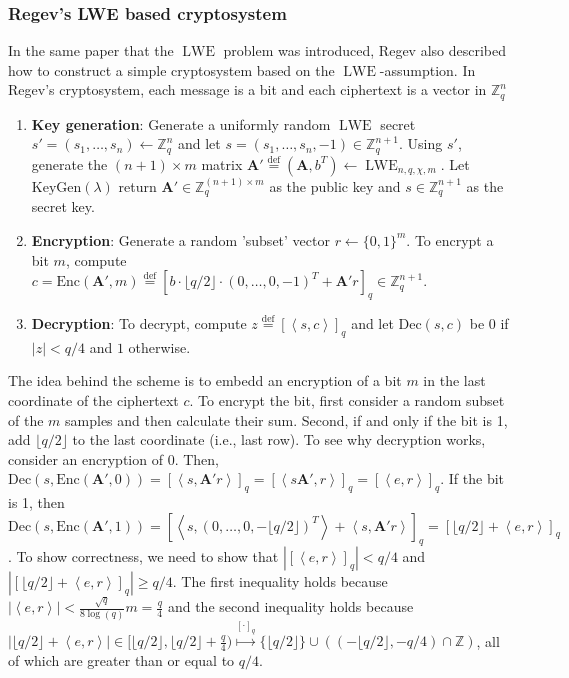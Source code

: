 \subsubsection*{Regev's LWE based cryptosystem}
In the same paper that the $\operatorname{LWE}$ problem was introduced, Regev also described how to construct a simple cryptosystem based on the $\operatorname{LWE}$-assumption. In Regev's cryptosystem, each message is a bit and each ciphertext is a vector in $\mathbb{Z}_q^n$
\begin{enumerate}
    \item \textbf{Key generation}: Generate a uniformly random $\operatorname{LWE}$ secret $s' = (s_1, \dots, s_n) \leftarrow \mathbb{Z}_q^n$ and let $s = (s_1, \dots, s_n, -1) \in \mathbb{Z}_q^{n+1}$. Using $s'$, generate the $(n+1) \times m$ matrix $\textbf{A}' \stackrel{\mathrm{def}}{=} (\textbf{A}, b^T) \leftarrow \operatorname{LWE}_{n,q,\chi,m}$. Let $\text{KeyGen}(\lambda)$ return $\textbf{A}' \in \mathbb{Z}_q^{(n+1)\times m}$ as the public key and $s \in \mathbb{Z}_q^{n+1}$ as the secret key.
    \item \textbf{Encryption}: Generate a random 'subset' vector $r \leftarrow \{0,1\}^m$. To encrypt a bit $m$, compute $c = \text{Enc}(\textbf{A}',m) \stackrel{\mathrm{def}}{=} [b \cdot \lfloor q/2 \rfloor \cdot (0, \dots, 0, -1)^T + \textbf{A}'r]_q \in \mathbb{Z}_q^{n+1}$.
    \item \textbf{Decryption}: To decrypt, compute $z \stackrel{\mathrm{def}}{=} [\left \langle s, c \right \rangle]_q$ and let $\text{Dec}(s,c)$ be $0$ if $|z| < q/4$ and $1$ otherwise.
\end{enumerate}

The idea behind the scheme is to embedd an encryption of a bit $m$ in the last coordinate of the ciphertext $c$. To encrypt the bit, first consider a random subset of the $m$ samples and then calculate their sum. Second, if and only if the bit is 1, add $\lfloor q/2 \rfloor$ to the last coordinate (i.e., last row). To see why decryption works, consider an encryption of $0$. Then, $\text{Dec}(s,\text{Enc}(\textbf{A}',0))= [\left \langle s, \textbf{A}'r \right \rangle]_q = [\left \langle s \textbf{A}', r \right \rangle]_q = [\left \langle e, r \right \rangle]_q$. If the bit is 1, then $\text{Dec}(s,\text{Enc}(\textbf{A}',1)) = [\left \langle s, (0, \dots, 0, -\lfloor q/2 \rfloor)^T \right \rangle + \left \langle s, \textbf{A}'r \right \rangle ]_q = [\lfloor q/2 \rfloor + \left \langle e, r \right \rangle]_q$.
To show correctness, we need to show that $|[\left \langle e, r \right \rangle]_q| < q/4$ and $|[\lfloor q/2 \rfloor + \left \langle e, r \right \rangle]_q| \geq q/4$. The first inequality holds because $| \left \langle e, r \right \rangle | < \frac{\sqrt{q}}{8\log(q)}m = \frac{q}{4}$ and the second inequality holds because $|\lfloor q/2 \rfloor + \left \langle e, r \right \rangle| \in [\lfloor q/2 \rfloor, \lfloor q/2 \rfloor + \frac{q}{4}) \stackrel{[\cdot]_q}{\mapsto} \{\lfloor q/2 \rfloor\} \cup ((- \lfloor q/2 \rfloor, -q/4) \cap \mathbb{Z})$, all of which are greater than or equal to $q/4$.


